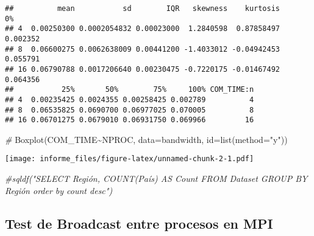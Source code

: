 \documentclass[
]{article}
\newenvironment{Shaded}{\begin{snugshade}}{\end{snugshade}}
\newcommand{\AttributeTok}[1]{\textcolor[rgb]{0.77,0.63,0.00}{#1}}
\newcommand{\CommentTok}[1]{\textcolor[rgb]{0.56,0.35,0.01}{\textit{#1}}}
\newcommand{\FunctionTok}[1]{\textcolor[rgb]{0.00,0.00,0.00}{#1}}
\newcommand{\NormalTok}[1]{#1}
\newcommand{\SpecialCharTok}[1]{\textcolor[rgb]{0.00,0.00,0.00}{#1}}
\newcommand{\StringTok}[1]{\textcolor[rgb]{0.31,0.60,0.02}{#1}}
\begin{document}
\begin{verbatim}
##          mean           sd        IQR   skewness    kurtosis       0%
## 4  0.00250300 0.0002054832 0.00023000  1.2840598  0.87858497 0.002352
## 8  0.06600275 0.0062638009 0.00441200 -1.4033012 -0.04942453 0.055791
## 16 0.06790788 0.0017206640 0.00230475 -0.7220175 -0.01467492 0.064356
##           25%       50%        75%     100% COM_TIME:n
## 4  0.00235425 0.0024355 0.00258425 0.002789          4
## 8  0.06535825 0.0690700 0.06977025 0.070005          8
## 16 0.06701275 0.0679010 0.06931750 0.069966         16
\end{verbatim}

\begin{Shaded}
\begin{Highlighting}[]
\CommentTok{\# }
\FunctionTok{Boxplot}\NormalTok{(COM\_TIME}\SpecialCharTok{\textasciitilde{}}\NormalTok{NPROC, }\AttributeTok{data=}\NormalTok{bandwidth, }\AttributeTok{id=}\FunctionTok{list}\NormalTok{(}\AttributeTok{method=}\StringTok{"y"}\NormalTok{))}
\end{Highlighting}
\end{Shaded}

\texttt{[image: informe\_files/figure-latex/unnamed-chunk-2-1.pdf]}

\begin{Shaded}
\begin{Highlighting}[]
\CommentTok{\#sqldf("SELECT  Región, COUNT(País) AS Count FROM Dataset GROUP BY Región order by count desc")}
\end{Highlighting}
\end{Shaded}

\hypertarget{test-de-broadcast-entre-procesos-en-mpi}{%
\subsection{Test de Broadcast entre procesos en
MPI}\label{test-de-broadcast-entre-procesos-en-mpi}}
\end{document}
